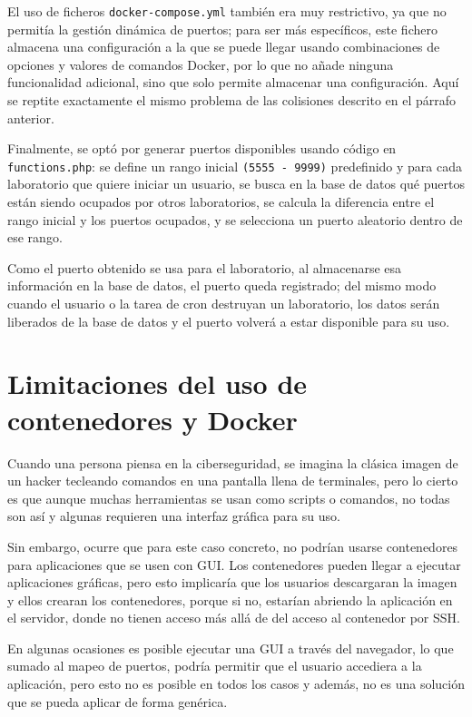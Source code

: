 \begin{appendices}
            El uso de ficheros \texttt{docker-compose.yml} también era muy restrictivo, ya que no permitía la gestión dinámica de puertos; para ser más específicos, este fichero almacena una configuración a la que se puede llegar usando combinaciones de opciones y valores de comandos Docker, por lo que no añade ninguna funcionalidad adicional, sino que solo permite almacenar una configuración. Aquí se reptite exactamente el mismo problema de las colisiones descrito en el párrafo anterior.

            Finalmente, se optó por generar puertos disponibles usando código en \texttt{functions.php}: se define un rango inicial \texttt{(5555 - 9999)} predefinido y para cada laboratorio que quiere iniciar un usuario, se busca en la base de datos qué puertos están siendo ocupados por otros laboratorios, se calcula la diferencia entre el rango inicial y los puertos ocupados, y se selecciona un puerto aleatorio dentro de ese rango.

            Como el puerto obtenido se usa para el laboratorio, al almacenarse esa información en la base de datos, el puerto queda registrado; del mismo modo cuando el usuario o la tarea de cron destruyan un laboratorio, los datos serán liberados de la base de datos y el puerto volverá a estar disponible para su uso.


    \section{Limitaciones del uso de contenedores y Docker}
        
        Cuando una persona piensa en la ciberseguridad, se imagina la clásica imagen de un hacker tecleando comandos en una pantalla llena de terminales, pero lo cierto es que aunque muchas herramientas se usan como scripts o comandos, no todas son así y algunas requieren una interfaz gráfica para su uso.

        Sin embargo, ocurre que para este caso concreto, no podrían usarse contenedores para aplicaciones que se usen con GUI. Los contenedores pueden llegar a ejecutar aplicaciones gráficas, pero esto implicaría que los usuarios descargaran la imagen y ellos crearan los contenedores, porque si no, estarían abriendo la aplicación en el servidor, donde no tienen acceso más allá de del acceso al contenedor por SSH.

        En algunas ocasiones es posible ejecutar una GUI a través del navegador, lo que sumado al mapeo de puertos, podría permitir que el usuario accediera a la aplicación, pero esto no es posible en todos los casos y además, no es una solución que se pueda aplicar de forma genérica.
        

\end{appendices}
